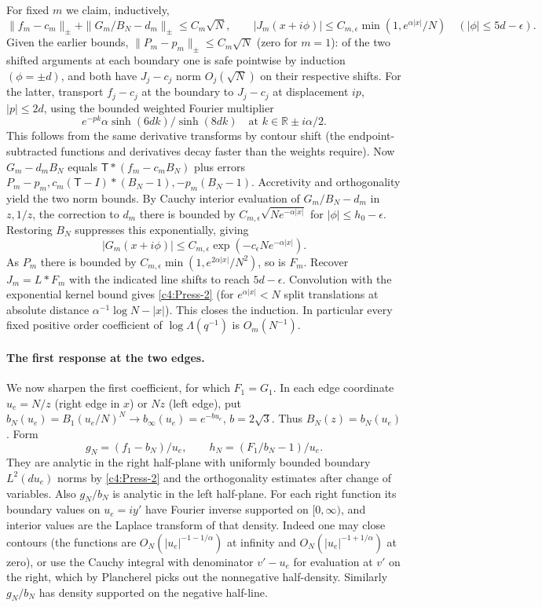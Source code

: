 For fixed \(m\) we claim, inductively,
\begin{equation}
 \|f_m-c_m\|_\pm+\|G_m/B_N-d_m\|_\pm\le C_m\sqrt N,\qquad
 |J_m(x+i\phi)|\le C_{m,\epsilon}\min(1,e^{\alpha|x|}/N)\quad (|\phi|\le 5d-\epsilon).
                                                                            \label{c4:Press-2}
\end{equation}
Given the earlier bounds, \(\|P_m-p_m\|_\pm\le C_m\sqrt N\) (zero for \(m=1\)): of the two shifted arguments at each boundary one is safe pointwise by induction \((\phi=\pm d)\), and both have \(J_j-c_j\) norm \(O_j(\sqrt N)\) on their respective shifts. For the latter, transport \(f_j-c_j\) at the boundary to \(J_j-c_j\) at displacement \(ip\), \(|p|\le2d\), using the bounded weighted Fourier multiplier
\[
                e^{-p k}\alpha\sinh(6dk)/\sinh(8dk)
                 \quad\text{at }k\in\mathbb R\pm i\alpha/2.
\]
This follows from the same derivative transforms by contour shift (the endpoint-subtracted functions and derivatives decay faster than the weights require). Now \(G_m-d_m B_N\) equals \(\mathsf T*(f_m-c_m B_N)\) plus errors \(P_m-p_m, c_m(\mathsf T-I)*(B_N-1), -p_m(B_N-1)\). Accretivity and orthogonality yield the two norm bounds. By Cauchy interior evaluation of \(G_m/B_N-d_m\) in \(z,1/z\), the correction to \(d_m\) there is bounded by \(C_{m,\epsilon}\sqrt{N e^{-\alpha|x|}}\) for \(|\phi|\le h_0-\epsilon\). Restoring \(B_N\) suppresses this exponentially, giving
\[
           |G_m(x+i\phi)|\le C_{m,\epsilon}\exp(-c_\epsilon N e^{-\alpha|x|}) .
\]
As \(P_m\) there is bounded by \(C_{m,\epsilon}\min(1,e^{2\alpha|x|}/N^2)\), so is \(F_m\). Recover \(J_m=L*F_m\) with the indicated line shifts to reach \(5d-\epsilon\). Convolution with the exponential kernel bound gives \eqref{c4:Press-2} (for \(e^{\alpha|x|}<N\) split translations at absolute distance \(\alpha^{-1}\log N-|x|\)). This closes the induction. In particular every fixed positive order coefficient of \(\log\Lambda(q^{-1})\) is \(O_m(N^{-1})\).

\paragraph{The first response at the two edges.}
We now sharpen the first coefficient, for which \(F_1=G_1\). In each
edge coordinate \(u_e=N/z\) (right edge in \(x\)) or \(Nz\) (left edge),
put \(b_N(u_e)=B_1(u_e/N)^N\to b_\infty(u_e)=e^{-b u_e}\),
\(b=2\sqrt3\). Thus \(B_N(z)=b_N(u_e)\). Form
\[
             g_N=(f_1-b_N)/u_e,\qquad h_N=(F_1/b_N-1)/u_e.
\]
They are analytic in the right half-plane with uniformly bounded boundary
\(L^2(du_e)\) norms by \eqref{c4:Press-2} and the orthogonality estimates
after change of variables. Also \(g_N/b_N\) is analytic in the left
half-plane. For each right function its boundary values on \(u_e=i y'\)
have Fourier inverse supported on \([0,\infty)\), and interior values
are the Laplace transform of that density. Indeed one may close contours
(the functions are \(O_N(|u_e|^{-1-1/\alpha})\) at infinity and
\(O_N(|u_e|^{-1+1/\alpha})\) at zero), or use the Cauchy integral with
denominator \(v'-u_e\) for evaluation at \(v'\) on the right, which by
Plancherel picks out the nonnegative half-density. Similarly
\(g_N/b_N\) has density supported on the negative half-line.

